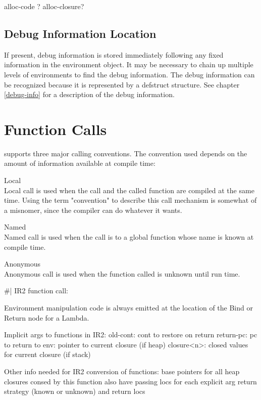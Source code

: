 {\begin{itemize, spread 0, spacing 1}
alloc-code ?
alloc-closure?


\subsection{Debug Information Location}

If present, debug information is stored immediately following any fixed
information in the environment object.  It may be necessary to chain up
multiple levels of environments to find the debug information.  The debug
information can be recognized because it is represented by a defstruct
structure.  See chapter \ref{debug-info} for a description of the debug
information.

		
\section{Function Calls}

\ccl supports three major calling conventions.  The convention used
depends on the amount of information available at compile time:
\begin{description}
Local\\Local call is used when the call and the called function are
compiled at the same time.  Using the term "convention" to describe this
call mechanism is somewhat of a misnomer, since the compiler can do
whatever it wants.

Named\\Named call is used when the call is to a global function whose name
is known at compile time.

Anonymous\\Anonymous call is used when the function called is unknown until
run time.
\end{description}

\#|
IR2 function call:

Environment manipulation code is always emitted at the location of the Bind or
Return node for a Lambda. 

Implicit args to functions in IR2:
  old-cont: cont to restore on return
  return-pc: pc to return to
  env: pointer to current closure (if heap)
  closure<n>: closed values for current closure (if stack)

Other info needed for IR2 conversion of functions:
    base pointers for all heap closures consed by this function
    also have passing locs for each explicit arg
    return strategy (known or unknown) and return locs


\end{itemize, spread 0, spacing 1}}
